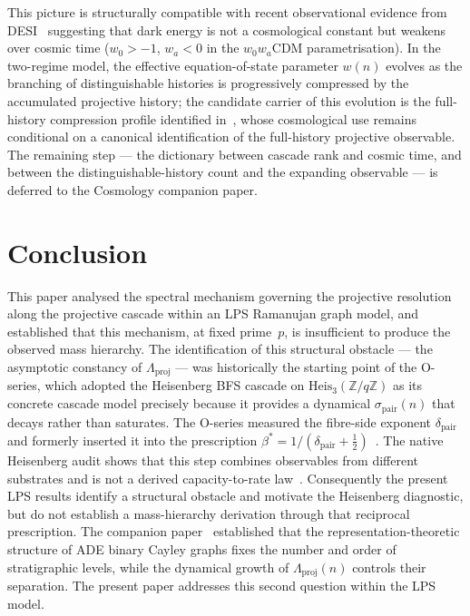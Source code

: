 \documentclass[12pt, a4paper]{article}
\theoremstyle{plain}
\theoremstyle{definition}
\theoremstyle{remark}
\begin{document}
      This picture is structurally compatible with recent observational evidence from
      DESI~\cite{DESI2025} suggesting that dark energy is not a cosmological constant
      but weakens over cosmic time ($w_0 > -1$, $w_a < 0$ in the $w_0 w_a$CDM
      parametrisation).
      In the two-regime model, the effective equation-of-state parameter $w(n)$
      evolves as the branching of distinguishable histories is progressively
      compressed by the accumulated projective history; the candidate carrier of
      this evolution is the full-history compression profile identified
      in~\cite{Beau2026tb}, whose cosmological use remains conditional on a
      canonical identification of the full-history projective observable.
      The remaining step --- the dictionary between cascade rank and cosmic time,
      and between the distinguishable-history count and the expanding observable
      --- is deferred to the Cosmology companion paper.

  \section{Conclusion}
    \label{sec:conclusion}

    This paper analysed the spectral mechanism governing the projective resolution
    along the projective cascade within an LPS Ramanujan graph model, and established
    that this mechanism, at fixed prime~$p$, is insufficient to produce the observed
    mass hierarchy.
    The identification of this structural obstacle --- the asymptotic constancy of
    $\Lambda_{\mathrm{proj}}$ --- was historically the starting point of the O-series,
    which adopted the Heisenberg BFS cascade on
    $\mathrm{Heis}_3(\mathbb{Z}/q\mathbb{Z})$ as its concrete cascade model precisely
    because it provides a dynamical $\sigma_{\mathrm{pair}}(n)$ that decays rather
    than saturates.
    The O-series measured the fibre-side exponent $\delta_{\mathrm{pair}}$ and formerly
    inserted it into the prescription
    $\beta^*=1/(\delta_{\mathrm{pair}}+\tfrac12)$~\cite{Beau2026a28,Beau2026a29}.
    The native Heisenberg audit shows that this step combines observables from different
    substrates and is not a derived capacity-to-rate law~\cite{Beau2026sgn}.
    Consequently the present LPS results identify a structural obstacle and motivate the
    Heisenberg diagnostic, but do not establish a mass-hierarchy derivation through that
    reciprocal prescription.
    The companion paper~\cite{Beau2026a4} established that the
    representation-theoretic structure of ADE binary Cayley graphs fixes the
    number and order of stratigraphic levels, while the dynamical growth of
    $\Lambda_{\mathrm{proj}}(n)$ controls their separation.
    The present paper addresses this second question within the LPS model.
\end{document}
